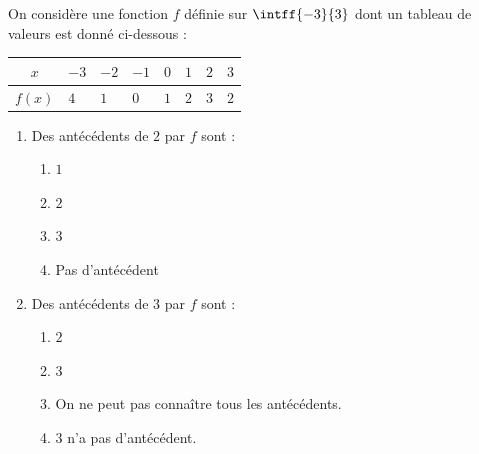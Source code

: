 \begin{exo}{}
	On considère une fonction $f$ définie sur $\intff{-3}{3}$ dont un tableau de valeurs est donné ci-dessous :


	\begin{center}
		\renewcommand{\arraystretch}{1.5}
		\begin{tabular}{|c|C{5mm}|C{5mm}|C{5mm}|C{5mm}|C{5mm}|C{5mm}|C{5mm}|} \hline
			$x$    & $-3$ & $-2$ & $-1$ & $0$ & $1$ & $2$ & $3$ \\ \hline
			$f(x)$ & $4$  & $1$  & $0$  & $1$ & $2$ & $3$ & $2$ \\ \hline
		\end{tabular}
	\end{center}
	\begin{enumerate}
		\item Des antécédents de $2$ par $f$ sont :
		      \vspace*{-2mm}
		      \begin{multicols}{2}
		      \begin{enumerate}
			      \item $1$
			      \item $2$
			      \item $3$
			      \item Pas d'antécédent
		      \end{enumerate}
		      \end{multicols}
		      \vspace*{-4mm}
		\item Des antécédents de $3$ par $f$ sont :
		      \begin{enumerate}
			      \item $2$
			      \item $3$
			      \item On ne peut pas connaître tous les antécédents.
			      \item $3$ n'a pas d'antécédent.
		      \end{enumerate}
	\end{enumerate}
\end{exo}
